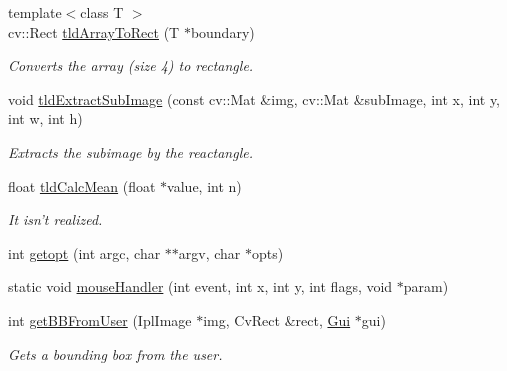\begin{DoxyCompactItemize}
{\footnotesize template$<$class T $>$ }\\cv\-::\-Rect \hyperlink{namespacetld_ad23d08bb67b847f43e2781a53f4af957}{tld\-Array\-To\-Rect} (T $\ast$boundary)
\begin{DoxyCompactList}\small\item\em Converts the array (size 4) to rectangle. \end{DoxyCompactList}\item 
void \hyperlink{namespacetld_a7699b7dc20502fc6d7c5c6c6cbd4be7b}{tld\-Extract\-Sub\-Image} (const cv\-::\-Mat \&img, cv\-::\-Mat \&sub\-Image, int x, int y, int w, int h)
\begin{DoxyCompactList}\small\item\em Extracts the subimage by the reactangle. \end{DoxyCompactList}\item 
float \hyperlink{namespacetld_ac0065f4088098aca6e1edd49b2b0f9d3}{tld\-Calc\-Mean} (float $\ast$value, int n)
\begin{DoxyCompactList}\small\item\em It isn't realized. \end{DoxyCompactList}\item 
int \hyperlink{namespacetld_a5b279570cd95fb0067a41b5a222e2642}{getopt} (int argc, char $\ast$$\ast$argv, char $\ast$opts)
\item 
static void \hyperlink{namespacetld_aed141e469725fa20f8828efbe29e57f1}{mouse\-Handler} (int event, int x, int y, int flags, void $\ast$param)
\item 
int \hyperlink{namespacetld_a75cd208f8053ece69d5d7de9c2ed33fd}{get\-B\-B\-From\-User} (Ipl\-Image $\ast$img, Cv\-Rect \&rect, \hyperlink{classtld_1_1Gui}{Gui} $\ast$gui)
\begin{DoxyCompactList}\small\item\em Gets a bounding box from the user. \end{DoxyCompactList}\end{DoxyCompactItemize}
